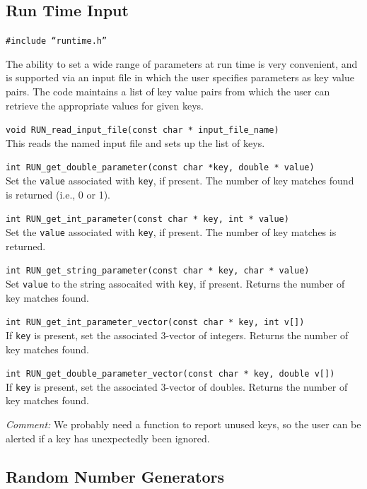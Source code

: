 \subsection{Run Time Input}

\texttt{\#include ``runtime.h''}

The ability to set a wide range of parameters at run time is
very convenient, and is supported via an input file in which the
user specifies parameters as key value pairs. The code maintains
a list of key value pairs from which the user can retrieve the
appropriate values for given keys.


\texttt{void RUN\_read\_input\_file(const char * input\_file\_name)}\\
This reads the named input file and sets up the list of keys.

\texttt{int RUN\_get\_double\_parameter(const char *key, double * value)}\\
Set the \texttt{value} associated with \texttt{key}, if present. The number
of key matches found is returned (i.e., 0 or 1).

\texttt{int RUN\_get\_int\_parameter(const char * key, int * value)}\\
Set the \texttt{value} associated with \texttt{key}, if present. The
number of key matches is returned.

\texttt{int  RUN\_get\_string\_parameter(const char * key, char * value)}\\
Set \texttt{value} to the string assocaited with \texttt{key}, if
present. Returns the number of key matches found.

\texttt{int  RUN\_get\_int\_parameter\_vector(const char * key, int v[])}\\
If \texttt{key} is present, set the associated 3-vector of integers.
Returns the number of key matches found. 

\texttt{int  RUN\_get\_double\_parameter\_vector(const char * key,
double v[])}\\
If \texttt{key} is present, set the associated 3-vector of doubles.
Returns the number of key matches found.

\textit{Comment:} We probably need a function to report unused keys, so
the user can be alerted if a key has unexpectedly been ignored.


\subsection{Random Number Generators}

